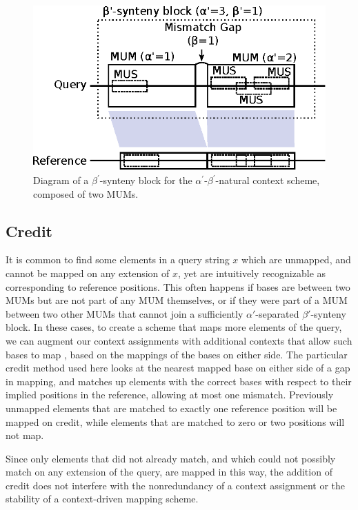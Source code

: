 \begin{figure}
\centering
  \includegraphics[width=1.0\columnwidth]{figures/02_contextschemes/MUMs.eps}
  \caption[Diagram of a {$\beta^\prime$}-synteny block]{Diagram of a $\beta^\prime$-synteny block for the $\alpha^\prime$-$\beta^\prime$-natural context scheme, composed of two MUMs.}
  \label{fig:model}
\end{figure}

\subsection{Credit}

It is common to find some elements in a query string $x$ which are unmapped, and cannot be mapped on any extension of $x$, yet are intuitively recognizable as corresponding to reference positions. This often happens if bases are between two MUMs but are not part of any MUM themselves, or if they were part of a MUM between two other MUMs that cannot join a sufficiently $\alpha'$-separated $\beta'$-synteny block. In these cases, to create a scheme that maps more elements of the query,  we can augment our context assignments with additional contexts that allow such bases to map , based on the mappings of the bases on either side. The particular credit method used here looks at the nearest mapped base on either side of a gap in mapping, and matches up elements with the correct bases with respect to their implied positions in the reference, allowing at most one mismatch. Previously unmapped elements that are matched to exactly one reference position will be mapped on credit, while elements that are matched to zero or two positions will not map.

Since only elements that did not already match, and which could not possibly match on any extension of the query, are mapped in this way, the addition of credit does not interfere with the nonredundancy of a context assignment or the stability of a context-driven mapping scheme.

